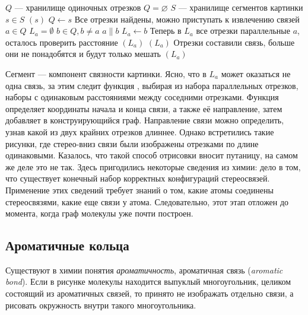 \begin{codebox}
  \li \Comment $Q$ --- хранилище одиночных отрезков
  \li $Q = \varnothing$
  \li
  \li \Comment $S$ --- хранилище сегментов картинки  
  \li \For $s \in S$ 	
  \li \Do \If {}$(s)$
  \li   	\Then $Q \gets s$
  \li \End \End
  \li \Comment Все отрезки найдены, можно приступать к извлечению связей
  \li \For $a \in Q$
  \li \Do $L_{a} = \emptyset $ 
  \li \For $b \in Q, b \ne a$ 
  \li \Do \If $ a \parallel b $
  \li \Then $L_{a} \gets b$
  \li \End \End 
  \li \Comment Теперь в $L_{a}$ все отрезки параллельные $a$, осталось проверить расстояние
  \li \If {}$(L_{a})$
  \li \Then {}$(L_{a})$
  \li \Comment Отрезки составили связь, больше они не понадобятся и будут только мешать
  \li {}$(L_{a})$
\end{codebox}

\noindent
Сегмент --- компонент связности картинки. Ясно, что в $L_{a}$ может оказаться не одна связь, за этим следит функция , выбирая
из набора параллельных отрезков, наборы с одинаковым расстояниями между соседними отрезками. Функция  определяет
координаты начала и конца связи, а также её направление, затем добавляет в конструирующийся граф. Направление связи можно определить, узнав
какой из двух крайних отрезков длиннее. Однако встретились такие рисунки, где стерео-вниз связи были изображены отрезками по длине одинаковыми.
Казалось, что такой способ отрисовки вносит путаницу, на самом же деле это не так. Здесь пригодились некоторые сведения из химии: дело в том, что
существует конечный набор корректных конфигураций стереосвязей. Применение этих сведений требует знаний о том, какие атомы соединены стереосвязями,
какие еще связи у атома. Следовательно, этот этап отложен до момента, когда граф молекулы уже почти построен.  


\subsection{Ароматичные кольца}
\label{subsec:rings}

Существуют в химии понятия \emph{ароматичность}, ароматичная связь (\emph{aromatic bond}). Если в рисунке молекулы находится выпуклый 
многоугольник, целиком состоящий из ароматичных связей, то принято не изображать отдельно связи, а рисовать окружность внутри такого многоугольника.

